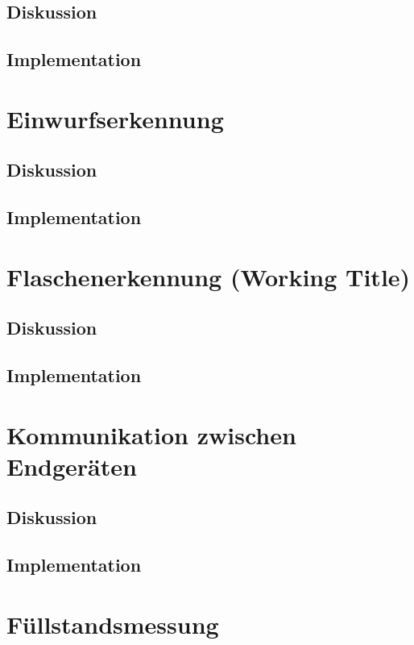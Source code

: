     \subsection{Diskussion}

    \subsection{Implementation}

\section{Einwurfserkennung}
    \subsection{Diskussion}

    \subsection{Implementation}

\section{Flaschenerkennung (Working Title)}
    \subsection{Diskussion}

    \subsection{Implementation}

\section{Kommunikation zwischen Endgeräten}
    \subsection{Diskussion}

    \subsection{Implementation}

\section{Füllstandsmessung}
